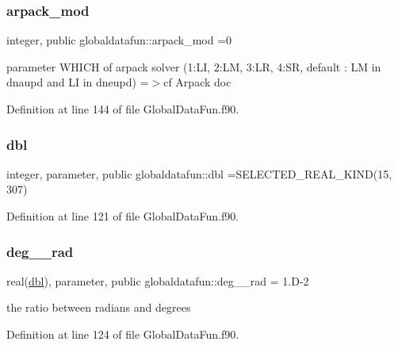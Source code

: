 \subsubsection{\texorpdfstring{arpack\+\_\+mod}{arpack\_mod}}
{\footnotesize\ttfamily integer, public globaldatafun\+::arpack\+\_\+mod =0}



parameter W\+H\+I\+CH of arpack solver (1\+:LI, 2\+:LM, 3\+:LR, 4\+:SR, default \+: LM in dnaupd and LI in dneupd) =$>$cf Arpack doc 



Definition at line 144 of file Global\+Data\+Fun.\+f90.

\mbox{\label{namespaceglobaldatafun_a5008801201dd34f2af8eae07756befb4}} 
\subsubsection{\texorpdfstring{dbl}{dbl}}
{\footnotesize\ttfamily integer, parameter, public globaldatafun\+::dbl =S\+E\+L\+E\+C\+T\+E\+D\+\_\+\+R\+E\+A\+L\+\_\+\+K\+I\+ND(15, 307)}



Definition at line 121 of file Global\+Data\+Fun.\+f90.

\mbox{\label{namespaceglobaldatafun_a6cd96b1c5754b6f19020fd2ff826086d}} 
\subsubsection{\texorpdfstring{deg\+\_\+\_\+rad}{deg\_2\_rad}}
{\footnotesize\ttfamily real(\hyperlink{namespaceglobaldatafun_a5008801201dd34f2af8eae07756befb4}{dbl}), parameter, public globaldatafun\+::deg\+\_\+\_\+rad = 1.\+D-\/2}



the ratio between radians and degrees 



Definition at line 124 of file Global\+Data\+Fun.\+f90.

\mbox{\label{namespaceglobaldatafun_ae724ce0d8db999ac46505601fee29b3a}} 
